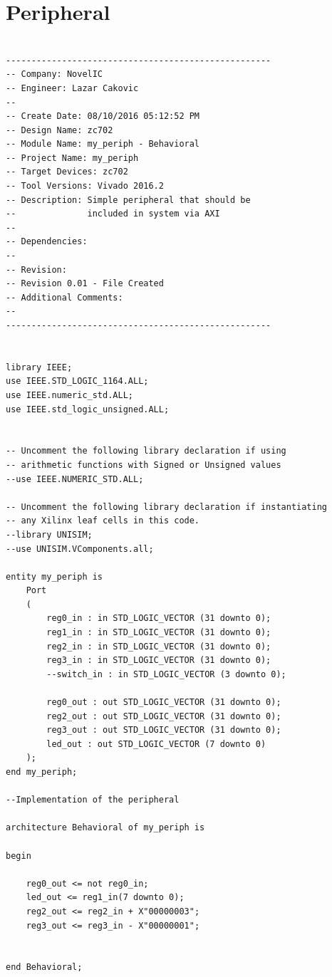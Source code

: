 \documentclass[a4paper, 12pt, diplomski]{etf}
\begin{document}
	\newpage


	\appendix


	\chapter{Peripheral}	\label{a:periph}

\begin{verbatim}

----------------------------------------------------
-- Company: NovelIC
-- Engineer: Lazar Cakovic
--
-- Create Date: 08/10/2016 05:12:52 PM
-- Design Name: zc702
-- Module Name: my_periph - Behavioral
-- Project Name: my_periph
-- Target Devices: zc702
-- Tool Versions: Vivado 2016.2
-- Description: Simple peripheral that should be
--				included in system via AXI
--
-- Dependencies:
--
-- Revision:
-- Revision 0.01 - File Created
-- Additional Comments:
--
----------------------------------------------------


library IEEE;
use IEEE.STD_LOGIC_1164.ALL;
use IEEE.numeric_std.ALL;
use IEEE.std_logic_unsigned.ALL;


-- Uncomment the following library declaration if using
-- arithmetic functions with Signed or Unsigned values
--use IEEE.NUMERIC_STD.ALL;

-- Uncomment the following library declaration if instantiating
-- any Xilinx leaf cells in this code.
--library UNISIM;
--use UNISIM.VComponents.all;

entity my_periph is
    Port
    (
        reg0_in : in STD_LOGIC_VECTOR (31 downto 0);
        reg1_in : in STD_LOGIC_VECTOR (31 downto 0);
        reg2_in : in STD_LOGIC_VECTOR (31 downto 0);
        reg3_in : in STD_LOGIC_VECTOR (31 downto 0);
        --switch_in : in STD_LOGIC_VECTOR (3 downto 0);

        reg0_out : out STD_LOGIC_VECTOR (31 downto 0);
        reg2_out : out STD_LOGIC_VECTOR (31 downto 0);
        reg3_out : out STD_LOGIC_VECTOR (31 downto 0);
        led_out : out STD_LOGIC_VECTOR (7 downto 0)
    );
end my_periph;

--Implementation of the peripheral

architecture Behavioral of my_periph is

begin

    reg0_out <= not reg0_in;
    led_out <= reg1_in(7 downto 0);
    reg2_out <= reg2_in + X"00000003";
    reg3_out <= reg3_in - X"00000001";


end Behavioral;


\end{verbatim}
\end{document}
